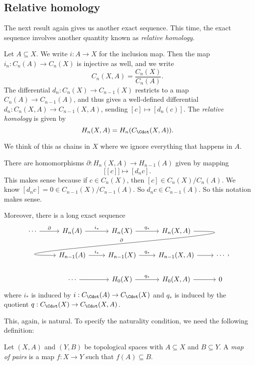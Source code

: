 \documentclass[a4paper]{article}
\theoremstyle{definition}
\begin{document}
\subsection{Relative homology}
The next result again gives us another exact sequence. This time, the exact sequence involves another quantity known as \emph{relative homology}.

\begin{defi}
  Let $A \subseteq X$. We write $i: A \to X$ for the inclusion map. Then the map $i_n: C_n(A) \to C_n(X)$ is injective as well, and we write
  \[
    C_n(X, A) = \frac{C_n(X)}{C_n(A)}.
  \]
  The differential $d_n: C_n(X) \to C_{n - 1}(X)$ restricts to a map $C_n(A) \to C_{n - 1}(A)$, and thus gives a well-defined differential $d_n: C_n(X, A) \to C_{n - 1}(X, A)$, sending $[c] \mapsto [d_n(c)]$. The \emph{relative homology} is given by
  \[
    H_n(X, A) = H_n(C_{\Cdot}(X, A)).
  \]
\end{defi}
We think of this as chains in $X$ where we ignore everything that happens in $A$.

\begin{thm}
  There are homomorphisms $\partial: H_n(X, A) \to H_{n - 1}(A)$ given by mapping
  \[
    \big[[c]\big] \mapsto [d_n c].
  \]
  This makes sense because if $c \in C_n(X)$, then $[c] \in C_n(X)/C_n(A)$. We know $[d_n c] = 0 \in C_{n - 1}(X)/C_{n - 1}(A)$. So $d_n c \in C_{n - 1}(A)$. So this notation makes sense.

  Moreover, there is a long exact sequence
  \[
    \begin{tikzcd}
      \cdots \ar[r, "\partial"] & H_n(A) \ar[r, "i_*"] & H_n(X) \ar[r, "q_*"] & H_n(X, A)\ar[out=0, in=180, looseness=2, overlay, lld, "\partial"']\\
      & H_{n - 1}(A) \ar[r, "i_*"] & H_{n - 1}(X) \ar[r, "q_*"] & H_{n - 1}(X, A) \ar [r] & \cdots\\
      &\cdots \ar[r] & H_0(X) \ar[r, "q_*"] & H_0(X, A) \ar [r] & 0
    \end{tikzcd},
  \]
  where $i_*$ is induced by $i: C_{\Cdot}(A) \to C_{\Cdot}(X)$ and $q_*$ is induced by the quotient $q: C_{\Cdot}(X) \to C_{\Cdot}(X, A)$.
\end{thm}

This, again, is natural. To specify the naturality condition, we need the following definition:
\begin{defi}
  Let $(X, A)$ and $(Y, B)$ be topological spaces with $A \subseteq X$ and $B \subseteq Y$. A \emph{map of pairs} is a map $f: X \to Y$ such that $f(A) \subseteq B$.
\end{defi}
\end{document}
